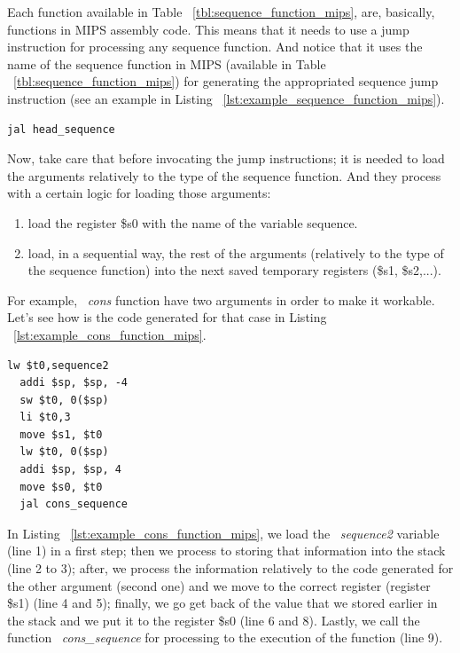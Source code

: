 \documentclass[
  oneside,
  11pt, a4paper,
  footinclude=true,
  headinclude=true,
  cleardoublepage=empty
]{scrbook}
\begin{document}
Each function available in Table ~\ref{tbl:sequence_function_mips}, are, basically, functions in MIPS assembly code. This means that it needs to use a jump instruction for processing any sequence function. And notice that it uses the name of the sequence function in MIPS (available in Table ~\ref{tbl:sequence_function_mips}) for generating the appropriated sequence jump instruction (see an example in Listing ~\ref{lst:example_sequence_function_mips}).

\begin{lstlisting}[caption={Example of processing a head function in MIPS},label={lst:example_sequence_function_mips}]
  jal head_sequence
\end{lstlisting}

Now, take care that before invocating the jump instructions; it is needed to load the arguments relatively to the type of the sequence function. And they process with a certain logic for loading those arguments:

\begin{enumerate}
\item load the register \$s0 with the name of the variable sequence.
\item load, in a sequential way, the rest of the arguments (relatively to the type of the sequence function) into the next saved temporary registers (\$s1, \$s2,...).
\end{enumerate}

For example, ~\textit{cons} function have two arguments in order to make it workable. Let's see how is the code generated for that case in Listing ~\ref{lst:example_cons_function_mips}.

\begin{lstlisting}[caption={Example of a code generated for the function ~\textit{cons}},label={lst:example_cons_function_mips}]
  lw $t0,sequence2	
  addi $sp, $sp, -4
  sw $t0, 0($sp)
  li $t0,3		
  move $s1, $t0		
  lw $t0, 0($sp)
  addi $sp, $sp, 4
  move $s0, $t0		
  jal cons_sequence
\end{lstlisting}

In Listing ~\ref{lst:example_cons_function_mips}, we load the ~\textit{sequence2} variable (line 1) in a first step; then we process to storing that information into the stack (line 2 to 3); after, we process the information relatively to the code generated for the other argument (second one) and we move to the correct register (register \$s1) (line 4 and 5); finally, we go get back of the value that we stored earlier in the stack and we put it to the register \$s0 (line 6 and 8). Lastly, we call the function ~\textit{cons\_sequence} for processing to the execution of the function (line 9).
\end{document}

